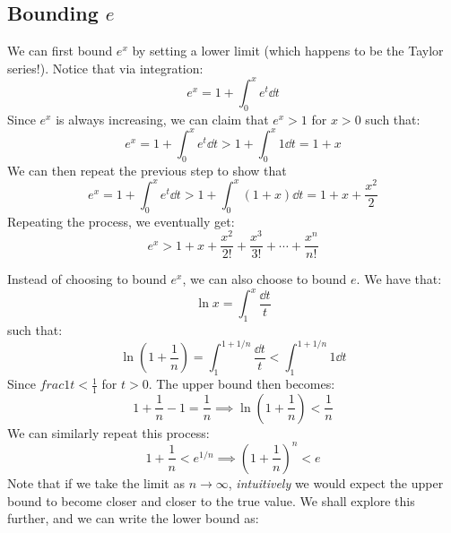 \documentclass{article}
\begin{document}
 \subsection{Bounding $e$}
 \begin{idea}
     We can first bound $e^x$ by setting a lower limit (which happens to be the Taylor series!). Notice that via integration:
     \begin{equation}
         e^x = 1 + \int_0^x e^t \dd{t}
         \label{eq:}
     \end{equation}
     Since $e^x$ is always increasing, we can claim that $e^x > 1$ for $x>0$ such that:
     \begin{equation}
         e^x = 1 + \int_0^x e^t \dd{t} > 1 + \int_0^x 1 \dd{t} = 1 + x
         \label{eq:}
     \end{equation}
     We can then repeat the previous step to show that
     \begin{equation}
        e^x = 1 + \int_0^x e^t \dd{t} > 1 + \int_0^x (1+x) \dd{t} = 1 + x + \frac{x^2}{2}
        \label{eq:}
    \end{equation}
    Repeating the process, we eventually get:
    \begin{equation}
        e^x > 1 + x + \frac{x^2}{2!} + \frac{x^3}{3!} + \cdots + \frac{x^n}{n!}
        \label{eq:}
    \end{equation}
 \end{idea}
 Instead of choosing to bound $e^x$, we can also choose to bound $e$. We have that:
 \begin{equation}
     \ln x = \int_1^x \frac{\dd{t}}{t}
     \label{eq:}
 \end{equation}
 such that:
 \begin{equation}
     \ln\left(1+\frac{1}{n}\right) = \int_1^{1+1/n} \frac{\dd{t}}{t} < \int_1^{1+1/n} 1 \dd{t}
     \label{eq:}
 \end{equation}
 Since $frac{1}{t} < \frac{1}{1}$ for $t>0$. The upper bound then becomes:
 \begin{equation}
     1+\frac{1}{n}-1 = \frac{1}{n} \implies \ln\left(1+\frac{1}{n}\right) < \frac{1}{n}
     \label{eq:}
 \end{equation}
 We can similarly repeat this process:
 \begin{equation}
     1+\frac{1}{n} < e^{1/n} \implies (1+\frac{1}{n})^n < e
     \label{eq:}
 \end{equation}
 Note that if we take the limit as $n\to\infty$, \textit{intuitively} we would expect the upper bound to become closer and closer to the true value. We shall explore this further, and we can write the lower bound as:
\end{document}
